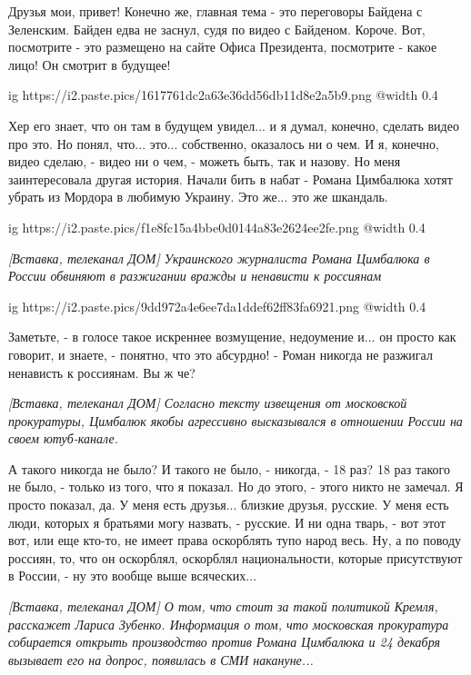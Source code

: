 \begin{multicols}{2} %
\setlength{\parindent}{0pt}

Друзья мои, привет! Конечно же, главная тема - это переговоры Байдена с
Зеленским. Байден едва не заснул, судя по видео с Байденом. Короче. Вот,
посмотрите - это размещено на сайте Офиса Президента, посмотрите - какое лицо!
Он смотрит в будущее!

\ifcmt
  ig https://i2.paste.pics/1617761dc2a63e36dd56db11d8e2a5b9.png
  @width 0.4
\fi

Хер его знает, что он там в будущем увидел... и я думал, конечно, сделать видео
про это. Но понял, что... это... собственно, оказалось ни о чем. И я, конечно,
видео сделаю, - видео ни о чем, - можеть быть, так и назову. Но меня
заинтересовала другая история. Начали бить в набат - Романа Цимбалюка хотят
убрать из Мордора в любимую Украину. Это же... это же шкандаль. 

\ifcmt
  ig https://i2.paste.pics/f1e8fc15a4bbe0d0144a83e2624ee2fe.png
  @width 0.4
\fi

{\em\color{blue}
[Вставка, телеканал ДОМ]
Украинского журналиста Романа Цимбалюка в России обвиняют в разжигании вражды и
ненависти к россиянам
}

\ifcmt
  ig https://i2.paste.pics/9dd972a4e6ee7da1ddef62ff83fa6921.png
  @width 0.4
\fi

Заметьте, - в голосе такое искреннее возмущение, недоумение и... он просто как говорит, и знаете, - 
понятно, что это абсурдно! - Роман никогда не разжигал ненависть к россиянам. Вы ж че?

{\em\color{blue}
[Вставка, телеканал ДОМ]
Согласно тексту извещения от московской прокуратуры, Цимбалюк якобы агрессивно
высказывался в отношении России на своем ютуб-канале.
}

А такого никогда не было? И такого не было, - никогда, - 18 раз? 18 раз такого
не было, - только из того, что я показал.  Но до этого, - этого никто не
замечал. Я просто показал, да. У меня есть друзья... близкие друзья, русские. У
меня есть люди, которых я братьями могу назвать, - русские. И ни одна тварь, -
вот этот вот, или еще кто-то, не имеет права оскорблять тупо народ весь. Ну, а
по поводу россиян, то, что он оскорблял, оскорблял национальности, которые
присутствуют в России, - ну это вообще выше всяческих... 

{\em\color{blue}
[Вставка, телеканал ДОМ]
О том, что стоит за такой политикой Кремля, расскажет Лариса Зубенко. Информация о том, что 
московская прокуратура собирается открыть производство против Романа Цимбалюка и 24 декабря
вызывает его на допрос, появилась в СМИ накануне...
}


\end{multicols}
